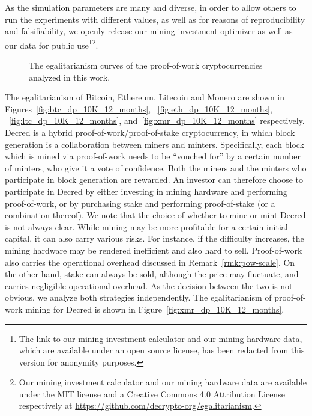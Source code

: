 As the simulation parameters are many and diverse, in order to allow others to
run the experiments with different values, as well as for reasons of
reproducibility and falsifiability, we openly release our mining investment
optimizer as well as our data for public use\ifanonymous\footnote{The link to our mining investment calculator and our mining hardware data,
  which are available under an open source license, has been redacted from this
  version for anonymity purposes.
}\else\footnote{Our mining investment calculator and our mining hardware data are available
  under the MIT license and a Creative Commons 4.0 Attribution License
  respectively at \url{https://github.com/decrypto-org/egalitarianism}.
}\fi.

\begin{figure}
  \caption{The egalitarianism curves of the proof-of-work cryptocurrencies analyzed in this work.}
  \label{fig:egalitarian_curves_pow}
\end{figure}

The egalitarianism of Bitcoin, Ethereum, Litecoin and Monero are shown in
Figures~\ref{fig:btc_dp_10K_12_months}, ~\ref{fig:eth_dp_10K_12_months},
~\ref{fig:ltc_dp_10K_12_months}, and~\ref{fig:xmr_dp_10K_12_months}
respectively.
Decred is a hybrid proof-of-work/proof-of-stake cryptocurrency, in
which block generation is a collaboration between miners and minters.
Specifically, each block which is mined via proof-of-work needs to be
``vouched for'' by a certain number of minters, who give it a vote of
confidence. Both the miners and the minters who participate in block
generation are rewarded. An investor can therefore choose to participate in
Decred by either investing in mining hardware and performing proof-of-work, or
by purchasing stake and performing proof-of-stake (or a combination thereof).
We note that the choice of whether to mine or mint Decred is not always clear.
While mining may be more profitable for a certain initial capital, it can also
carry various risks. For instance, if the difficulty increases, the mining
hardware may be rendered inefficient and also hard to sell. Proof-of-work also
carries the operational overhead discussed in Remark~\ref{rmk:pow-scale}. On
the other hand, stake can always be sold, although the price may fluctuate, and
carries negligible operational overhead. As the decision between the two is not
obvious, we analyze both strategies independently. The egalitarianism of
proof-of-work mining for Decred is shown in
Figure~\ref{fig:xmr_dp_10K_12_months}.

